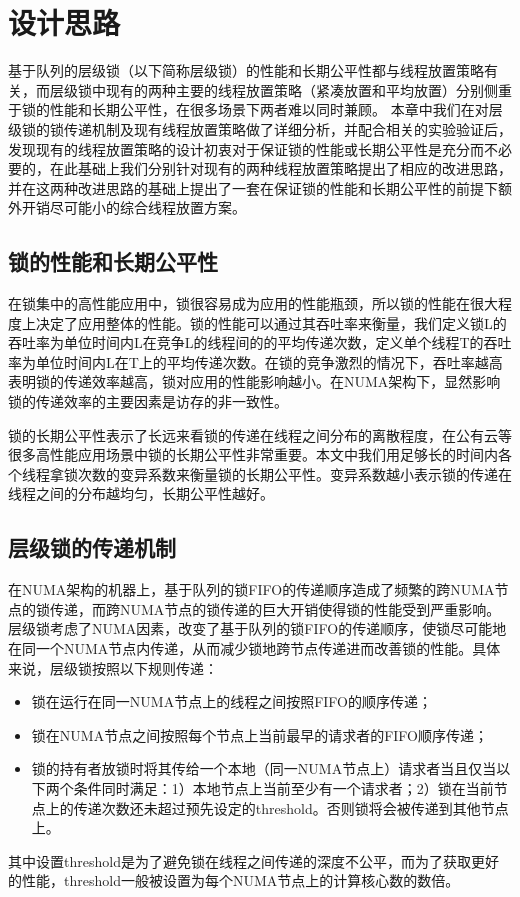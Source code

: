 \chapter{设计思路}
\label{chap:example}
基于队列的层级锁（以下简称层级锁）的性能和长期公平性都与线程放置策略有关，而层级锁中现有的两种主要的线程放置策略（紧凑放置和平均放置）分别侧重于锁的性能和长期公平性，在很多场景下两者难以同时兼顾。
本章中我们在对层级锁的锁传递机制及现有线程放置策略做了详细分析，并配合相关的实验验证后，发现现有的线程放置策略的设计初衷对于保证锁的性能或长期公平性是充分而不必要的，在此基础上我们分别针对现有的两种线程放置策略提出了相应的改进思路，并在这两种改进思路的基础上提出了一套在保证锁的性能和长期公平性的前提下额外开销尽可能小的综合线程放置方案。


\section{锁的性能和长期公平性}
在锁集中的高性能应用中，锁很容易成为应用的性能瓶颈，所以锁的性能在很大程度上决定了应用整体的性能\cite{johnson2010decoupling}。锁的性能可以通过其吞吐率来衡量，我们定义锁L的吞吐率为单位时间内L在竞争L的线程间的的平均传递次数，定义单个线程T的吞吐率为单位时间内L在T上的平均传递次数。在锁的竞争激烈的情况下，吞吐率越高表明锁的传递效率越高，锁对应用的性能影响越小。在NUMA架构下，显然影响锁的传递效率的主要因素是访存的非一致性。

锁的长期公平性表示了长远来看锁的传递在线程之间分布的离散程度，在公有云等很多高性能应用场景中锁的长期公平性非常重要。本文中我们用足够长的时间内各个线程拿锁次数的变异系数来衡量锁的长期公平性。变异系数越小表示锁的传递在线程之间的分布越均匀，长期公平性越好。

\section{层级锁的传递机制}
在NUMA架构的机器上，基于队列的锁FIFO的传递顺序造成了频繁的跨NUMA节点的锁传递，而跨NUMA节点的锁传递的巨大开销使得锁的性能受到严重影响。层级锁考虑了NUMA因素，改变了基于队列的锁FIFO的传递顺序，使锁尽可能地在同一个NUMA节点内传递，从而减少锁地跨节点传递进而改善锁的性能。具体来说，层级锁按照以下规则传递：
\begin{itemize}
\item 锁在运行在同一NUMA节点上的线程之间按照FIFO的顺序传递；
\item 锁在NUMA节点之间按照每个节点上当前最早的请求者的FIFO顺序传递；
\item 锁的持有者放锁时将其传给一个本地（同一NUMA节点上）请求者当且仅当以下两个条件同时满足：1）本地节点上当前至少有一个请求者；2）锁在当前节点上的传递次数还未超过预先设定的threshold。否则锁将会被传递到其他节点上。
\end{itemize}
其中设置threshold是为了避免锁在线程之间传递的深度不公平，而为了获取更好的性能，threshold一般被设置为每个NUMA节点上的计算核心数的数倍。

